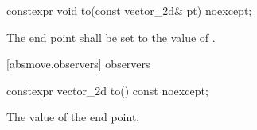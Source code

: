 \begin{itemdecl}
constexpr void to(const vector_2d& pt) noexcept;
\end{itemdecl}
\begin{itemdescr}
\pnum
\effects
The end point shall be set to the value of .
\end{itemdescr}

 [absmove.observers]{ observers}

\begin{itemdecl}
constexpr vector_2d to() const noexcept;
\end{itemdecl}
\begin{itemdescr}
\pnum
\returns
The value of the end point.
\end{itemdescr}
